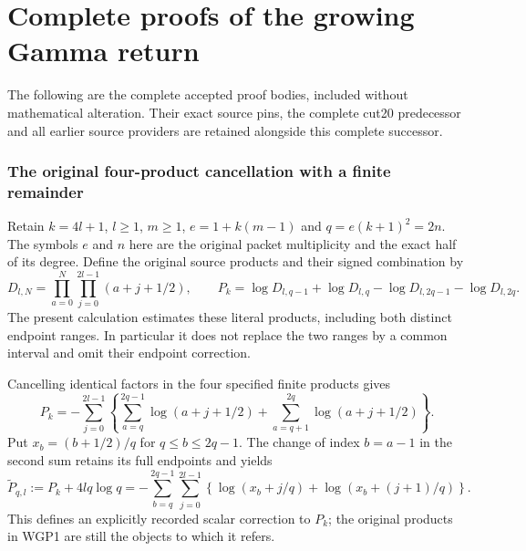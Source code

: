 \documentclass[11pt,a4paper]{article}
\begin{document}
\clearpage
\part*{Complete proofs of the growing Gamma return}
The following are the complete accepted proof bodies, included without
mathematical alteration. Their exact source pins, the complete cut20
predecessor and all earlier source providers are retained alongside
this complete successor.

\section{The original four-product cancellation with a finite remainder}
\label{sec:WGP}

Retain $k=4l+1$, $l\ge1$, $m\ge1$, $e=1+k(m-1)$ and
$q=e(k+1)^2=2n$. The symbols $e$ and $n$ here are the original
packet multiplicity and the exact half of its degree. Define the original
source products and their signed combination by
\[
 D_{l,N}=\prod_{a=0}^{N}\prod_{j=0}^{2l-1}(a+j+1/2),\qquad
 P_k=\log D_{l,q-1}+\log D_{l,q}
       -\log D_{l,2q-1}-\log D_{l,2q}.
 \tag{WGP1}
\]
The present calculation estimates these literal products, including both
distinct endpoint ranges. In particular it does not replace the two ranges
by a common interval and omit their endpoint correction.

Cancelling identical factors in the four specified finite products gives
\[
 P_k=-\sum_{j=0}^{2l-1}\left\{
 \sum_{a=q}^{2q-1}\log(a+j+1/2)
 +\sum_{a=q+1}^{2q}\log(a+j+1/2)\right\}.
 \tag{WGP2}
\]
Put $x_b=(b+1/2)/q$ for $q\le b\le2q-1$. The change of index
$b=a-1$ in the second sum retains its full endpoints and yields
\[
 \widetilde P_{q,l}:=P_k+4lq\log q
 =-\sum_{b=q}^{2q-1}\sum_{j=0}^{2l-1}
  \left\{\log(x_b+j/q)+\log(x_b+(j+1)/q)\right\}.
 \tag{WGP3}
\]
This defines an explicitly recorded scalar correction to $P_k$; the
original products in WGP1 are still the objects to which it refers.
\end{document}
